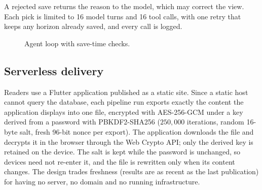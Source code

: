 \documentclass[preprint,11pt]{elsarticle}
\begin{document}
\noindent A rejected save returns the reason to the model, which may correct the view. Each pick is limited
to 16 model turns and 16 tool calls, with one retry that keeps any horizon already saved, and every call is
logged.

\begin{figure}[t]
\centering
{}
\caption{Agent loop with save-time checks.}
\label{fig:agent}
\end{figure}

\subsection{Serverless delivery}
\label{sec:delivery}

Readers use a Flutter application published as a static site. Since a static host cannot query the
database, each pipeline run exports exactly the content the application displays into one file, encrypted
with AES-256-GCM \cite{nist80038d} under a key derived from a password with PBKDF2-SHA256 \cite{rfc8018}
($250{,}000$ iterations, random 16-byte salt, fresh 96-bit nonce per export). The application downloads the
file and decrypts it in the browser through the Web Crypto API; only the derived key is retained on the
device. The salt is kept while the password is unchanged, so devices need not re-enter it, and the file is
rewritten only when its content changes. The design trades freshness (results are as recent as the last
publication) for having no server, no domain and no running infrastructure.
\end{document}

